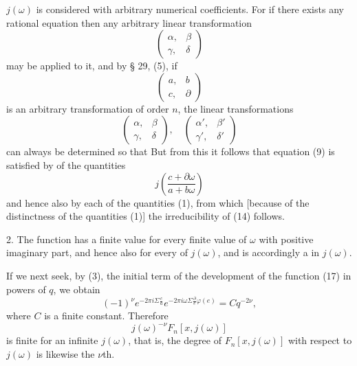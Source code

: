 $j(\omega)$ is considered with arbitrary numerical coefficients. For if
there exists any rational equation
then any arbitrary linear transformation
\[
\begin{pmatrix} \alpha, & \beta \\ \gamma, & \delta \end{pmatrix}
\]
may be applied to it, and by § 29, (5), if
\[
\begin{pmatrix} a, & b \\ c, & \partial \end{pmatrix}
\]
is an arbitrary transformation of order $n$, the linear
transformations
\[
\begin{pmatrix} \alpha, & \beta \\ \gamma, & \delta \end{pmatrix}, \quad
\begin{pmatrix} \alpha', & \beta' \\ \gamma', & \delta' \end{pmatrix}
\]
can always be determined so that
But from this it follows that equation (9) is satisfied by  of the
quantities
\[
j\left(\frac{c+\partial\omega}{a+b\omega}\right)
\]
and hence also by each of the quantities (1), from which
[because of the distinctness of the quantities (1)] the irreducibility
of (14) follows.

2. The function
has a finite value for every finite value of $\omega$ with positive imaginary part, and hence also for every  of $j(\omega)$, and is accordingly a  in $j(\omega)$.

If we next seek, by (3), the initial term of the development
of the function (17) in powers of $q$, we obtain
\[
(-1)^{\nu} e^{-2\pi i \Sigma \frac{c}{a}} e^{-2\pi i \omega \Sigma \frac{\partial}{e}\varphi(e)} = C q^{-2\nu},
\]
where $C$ is a finite constant. Therefore
\[
j(\omega)^{-\nu} F_n[x, j(\omega)]
\]
is finite for an infinite $j(\omega)$, that is, the degree of $F_n[x, j(\omega)]$
with respect to $j(\omega)$ is likewise the $\nu$th.
